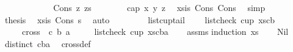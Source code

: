 \begin{isabellebody}
\ \ \ \ \isamarkupfalse%
\isanewline
\ \ \ \ \ \ \isamarkupfalse%
\ {\isacharparenleft}{\kern0pt}Cons\ z\ zs{\isacharparenright}{\kern0pt}\isanewline
\ \ \ \ \ \ \isamarkupfalse%
\ {\isachardoublequoteopen}cap{}\ x\ y\ z{\isachardoublequoteclose}\ \isamarkupfalse%
\ xs{\isacharunderscore}{\kern0pt}is\ Cons\ Cons{}\ \isamarkupfalse%
\ simp\isanewline
\ \ \ \ \ \ \isamarkupfalse%
\ \isamarkupfalse%
\ {\isacharquery}{\kern0pt}thesis\ \isamarkupfalse%
\ xs{\isacharunderscore}{\kern0pt}is\ Cons\ s{}\ \isamarkupfalse%
\ auto\isanewline
\ \ \ \ \isamarkupfalse%
\isanewline
\ \ \isamarkupfalse%
\isanewline
{}\isamarkupfalse%
%
\endisatagproof
{\isafoldproof}%
%
\isadelimproof
\isanewline
%
\endisadelimproof
\isanewline
{}\isamarkupfalse%
\ list{\isacharunderscore}{\kern0pt}cup{\isacharunderscore}{\kern0pt}tail{\isacharcolon}{\kern0pt}\ \isanewline
\ \ \ {\isachardoublequoteopen}list{\isacharunderscore}{\kern0pt}check\ cup{}\ {\isacharparenleft}{\kern0pt}xs{\isacharat}{\kern0pt}{\isacharbrackleft}{\kern0pt}c{\isacharcomma}{\kern0pt}b{\isacharbrackright}{\kern0pt}{\isacharparenright}{\kern0pt}{\isachardoublequoteclose}\isanewline
\ \ \ \ \ {\isachardoublequoteopen}cross{}\ \ c\ b\ a\ {\isachargreater}{\kern0pt}\ {}{\isachardoublequoteclose}\isanewline
\ \ \ {\isachardoublequoteopen}list{\isacharunderscore}{\kern0pt}check\ cup{}\ {\isacharparenleft}{\kern0pt}xs{\isacharat}{\kern0pt}{\isacharbrackleft}{\kern0pt}c{\isacharcomma}{\kern0pt}b{\isacharcomma}{\kern0pt}a{\isacharbrackright}{\kern0pt}{\isacharparenright}{\kern0pt}{\isachardoublequoteclose}\isanewline
%
\isadelimproof
\ \ %
\endisadelimproof
%
\isatagproof
{}\isamarkupfalse%
\ assms\isanewline
{}\isamarkupfalse%
{\isacharparenleft}{\kern0pt}induction\ xs{\isacharparenright}{\kern0pt}\isanewline
\ \ \isamarkupfalse%
\ Nil\isanewline
\ \ \isamarkupfalse%
\ {\isachardoublequoteopen}distinct\ {\isacharbrackleft}{\kern0pt}c{\isacharcomma}{\kern0pt}b{\isacharcomma}{\kern0pt}a{\isacharbrackright}{\kern0pt}{\isachardoublequoteclose}\ \isamarkupfalse%
\ cross{}{\isacharunderscore}{\kern0pt}def\ \isanewline
\ \ \ \ \isamarkupfalse%

\end{isabellebody}
